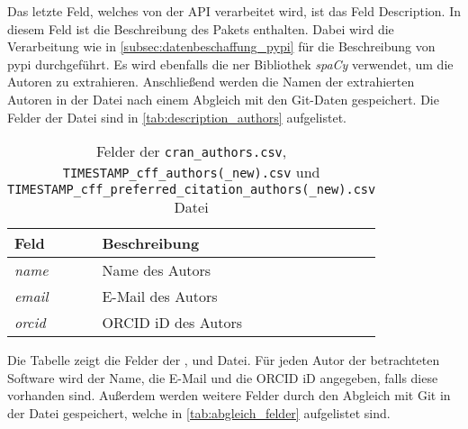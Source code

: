 Das letzte Feld, welches von der API verarbeitet wird, ist das Feld \glqq Description\grqq{}.
In diesem Feld ist die Beschreibung des Pakets enthalten.
Dabei wird die Verarbeitung wie in \autoref{subsec:datenbeschaffung_pypi} für die Beschreibung von \gls{pypi} durchgeführt.
Es wird ebenfalls die \gls{ner} Bibliothek \emph{spaCy} verwendet, um die Autoren zu extrahieren.
Anschließend werden die Namen der extrahierten Autoren in der Datei  nach einem Abgleich mit den Git-Daten gespeichert.
Die Felder der Datei sind in \autoref{tab:description_authors} aufgelistet.

\begin{table}
    \centering
    \begin{tabularx}{\textwidth}{XL{10.2cm}}
        \toprule
        \textbf{Feld} & \textbf{Beschreibung} \\ \midrule
        \emph{name}   & Name des Autors       \\
        \emph{email}  & E-Mail des Autors     \\
        \emph{orcid}  & ORCID iD des Autors   \\
        \bottomrule
    \end{tabularx}
    \caption{Felder der \texttt{cran\_authors.csv}, \texttt{TIMESTAMP\_cff\_authors(\_new).csv} und \texttt{TIMESTAMP\_cff\_preferred\_citation\_authors(\_new).csv} Datei}
    \label{tab:cran_authors}
    \small
    \raggedright
    Die Tabelle zeigt die Felder der ,  und  Datei. Für jeden Autor der betrachteten Software wird der Name, die E-Mail und die ORCID iD angegeben, falls diese vorhanden sind. Außerdem werden weitere Felder durch den Abgleich mit Git in der Datei gespeichert, welche in \autoref{tab:abgleich_felder} aufgelistet sind.
\end{table}
